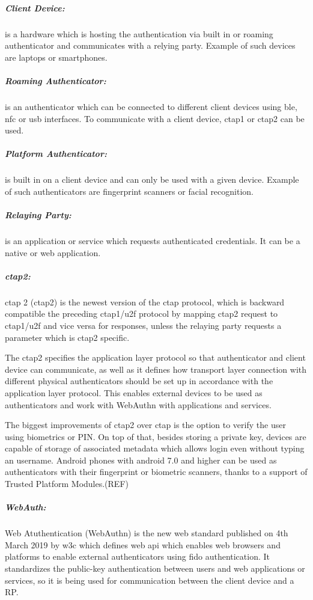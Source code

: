\subparagraph{Client Device:} 
is a hardware which is hosting the authentication via built in or roaming authenticator and communicates with a relying party. Example of such devices are laptops or smartphones. 

\subparagraph{Roaming Authenticator:} 
is an authenticator which can be connected to different client devices using \acrshort{ble}, \acrshort{nfc} or \acrshort{usb} interfaces. To communicate with a client device, \acrshort{ctap}1 or \acrshort{ctap}2 can be used.

\subparagraph{Platform Authenticator:} 
is built in on a client device and can only be used with a given device. Example of such authenticators are fingerprint scanners or facial recognition.

\subparagraph{Relaying Party:} 
is an application or service which requests authenticated credentials. It can be a native or web application.

\subparagraph{\acrshort{ctap}2:}
\acrlong{ctap} 2 (\acrshort{ctap}2) is the newest version of the \acrshort{ctap} protocol, which is backward compatible the preceding \acrshort{ctap}1/\acrshort{u2f} protocol by mapping \acrshort{ctap}2 request to \acrshort{ctap}1/\acrshort{u2f} and vice versa for responses, unless the relaying party requests a parameter which is \acrshort{ctap}2 specific. 

The \acrshort{ctap}2 specifies the application layer protocol so that authenticator and client device can communicate, as well as it defines how transport layer connection with different physical authenticators should be set up in accordance with the application layer protocol. This enables external devices to be used as authenticators and work with WebAuthn with applications and services.

The biggest improvements of \acrshort{ctap}2 over \acrshort{ctap} is the option to verify the user using biometrics or PIN. On top of that, besides storing a private key, devices are capable of storage of associated metadata which allows login even without typing an username. Android phones with android 7.0 and higher can be used as authenticators with their fingerprint or biometric scanners, thanks to a support of Trusted Platform Modules.(REF)

\subparagraph{WebAuth:} 
Web Atuthentication (WebAuthn) is the new web standard published on 4th March 2019  by \acrshort{w3c} which defines web \acrshort{api} which enables web browsers and platforms to enable external authenticators using \acrshort{fido} authentication. It standardizes the public-key authentication between users and web applications or services, so it is being used for communication between the client device and a RP.\\

